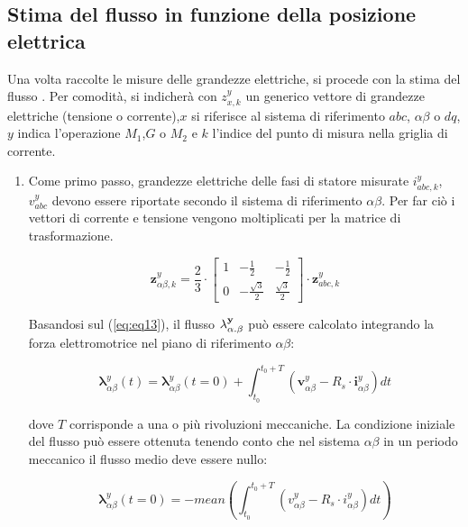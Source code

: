 \subsection{Stima del flusso in funzione della posizione elettrica}
\label{sec:stima_flusso}
Una volta raccolte le misure delle grandezze elettriche, si procede con la stima del flusso \cite{bojoi2024}.
Per comodità, si indicherà con $z_{x,k}^y$ un generico vettore di grandezze elettriche (tensione o corrente),$x$ si riferisce al sistema di riferimento $abc$, $\alpha\beta$ o $dq$, $y$ indica l'operazione $M_1$,$G$ o $M_2$ e $k$ l'indice del punto di misura nella griglia di corrente.
\begin{enumerate}
    \item Come primo passo, grandezze elettriche delle fasi di statore misurate $i^y_{abc,k}$, $v^y_{abc}$ devono essere riportate  secondo il sistema di riferimento $\alpha\beta$. Per far ciò i vettori di corrente e tensione vengono moltiplicati per la matrice di trasformazione.


\begin{equation}
\boldsymbol{z}_{\alpha\beta,k}^{y} = \frac{2}{3} \cdot 
\begin{bmatrix} 
1 & -\frac{1}{2} & -\frac{1}{2} \\ 
0 & -\frac{\sqrt{3}}{2} & \frac{\sqrt{3}}{2} 
\end{bmatrix} \cdot \boldsymbol{z}_{abc,k}^{y}
\label{eq:eq13}
\end{equation}

Basandosi sul (\ref{eq:eq13}), il flusso $\bf{\lambda}^y_{\alpha.\beta}$ può essere calcolato integrando la forza elettromotrice nel piano di riferimento $\alpha\beta$:

\begin{equation}
\boldsymbol{\lambda}_{\alpha\beta}^{y}(t) = \boldsymbol{\lambda}_{\alpha\beta}^{y}(t=0) + \int_{t_{0}}^{t_{0}+T} (\boldsymbol{v}_{\alpha\beta}^{y} - R_{s} \cdot \boldsymbol{i}_{\alpha\beta}^{y}) dt
\label{eq:integration_flux}
\end{equation}

dove $T$ corrisponde a una o più rivoluzioni meccaniche. La condizione iniziale del flusso può essere ottenuta tenendo conto che nel sistema $\alpha\beta$ in un periodo meccanico il flusso medio deve essere nullo:

\begin{equation}
\boldsymbol{\lambda}_{\alpha\beta}^{y}(t=0) = -mean \left( \int_{t_{0}}^{t_{0}+T} (v_{\alpha\beta}^{y} - R_{s} \cdot i_{\alpha\beta}^{y}) dt \right)
\label{eq:eq1}
\end{equation}


\end{enumerate}
